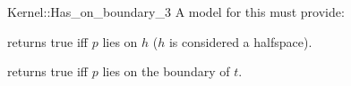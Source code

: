 \begin{ccRefFunctionObjectConcept}{Kernel::Has_on_boundary_3}
A model for this must provide:


{returns true iff $p$ lies on $h$ ($h$ is considered a halfspace).}

{returns true iff $p$ lies on the boundary of $t$.}

\end{ccRefFunctionObjectConcept}
